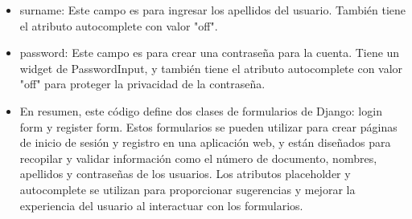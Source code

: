 \documentclass{article}
\begin{document}
\begin{itemize}
			\item surname: Este campo es para ingresar los apellidos del usuario. También tiene el atributo autocomplete con valor "off".
			\item password: Este campo es para crear una contraseña para la cuenta. Tiene un widget de PasswordInput, y también tiene el atributo autocomplete con valor "off" para proteger la privacidad de la contraseña.
			\item En resumen, este código define dos clases de formularios de Django: login form y register form. Estos formularios se pueden utilizar para crear páginas de inicio de sesión y registro en una aplicación web, y están diseñados para recopilar y validar información como el número de documento, nombres, apellidos y contraseñas de los usuarios. Los atributos placeholder y autocomplete se utilizan para proporcionar sugerencias y mejorar la experiencia del usuario al interactuar con los formularios.
			
	\end{itemize}	
	
		

\end{document}
